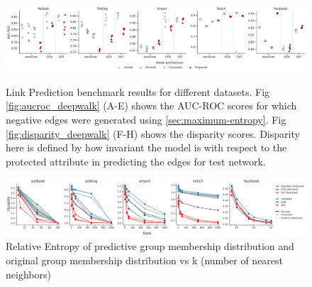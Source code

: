 \documentclass{article}
\theoremstyle{plain}
\theoremstyle{definition}
\theoremstyle{remark}
\begin{document}
\begin{figure}[h]
\centering

        \includegraphics{images/new_images/aucroc_deepwalk_proposed_comparison.pdf}
        \label{fig:aucroc_deepwalk_manipulation_comparison}
    \caption{Link Prediction benchmark results for different datasets. Fig \ref{fig:aucroc_deepwalk} (A-E) shows the AUC-ROC scores for which negative edges were generated using \ref{sec:maximum-entropy}. Fig \ref{fig:disparity_deepwalk} (F-H) shows the disparity scores. Disparity here is defined by how invariant the model is with respect to the protected attribute in predicting the edges for test network.} 
  \label{fig:sp}
\end{figure}

\begin{figure}[h!]
    \centering
    \includegraphics[width=\hsize]{images/new_images/disparity-curve_deepwalk.pdf}
    \caption{Relative Entropy of predictive group membership distribution and original group membership distribution vs k (number of nearest neighbors)}
    \label{fig:entropy_deepwalk}
\end{figure}
\end{document}
